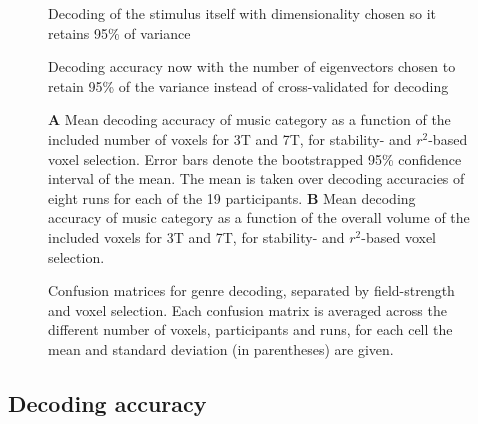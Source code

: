 \begin{figure}
  \centering
  \def\svgwidth{\linewidth}
  
	
  \caption{ Decoding of the stimulus itself with dimensionality chosen so it
	  retains 95\% of variance }%

 \label{fig:decoding_accuracy_stimulus}
\end{figure}

\begin{figure}
  \centering
  \def\svgwidth{\linewidth}
  
	
  \caption{ Decoding accuracy now with the number of eigenvectors chosen to
  retain 95\% of the variance instead of cross-validated for decoding }

 \label{fig:decoding_accuracy_var95}
\end{figure}

\begin{figure}
  \centering
  \def\svgwidth{\linewidth}
  
	
  \caption{\textbf{A} Mean decoding accuracy of music category as a function of
  the included number of voxels for 3T and 7T, for stability- and
  $r^2$-based voxel selection. Error bars denote the bootstrapped 95\%
  confidence interval of the mean. The mean is taken over decoding
  accuracies of eight runs for each of the 19 participants. \textbf{B} Mean
decoding accuracy of music category as a function of the overall volume of the
included voxels for 3T and 7T, for stability- and $r^2$-based voxel
selection.
}

 \label{fig:decoding_accuracy}
\end{figure}

\begin{figure}
  \centering
  \def\svgwidth{\linewidth}
  
	
  \caption{ Confusion matrices for genre decoding, separated by field-strength
  and voxel selection. Each confusion matrix is averaged across the different number
  of voxels, participants and runs, for each cell the mean and standard deviation (in parentheses)
  are given. }

 \label{fig:confusion_matrices}
\end{figure}

\subsection*{Decoding accuracy}

